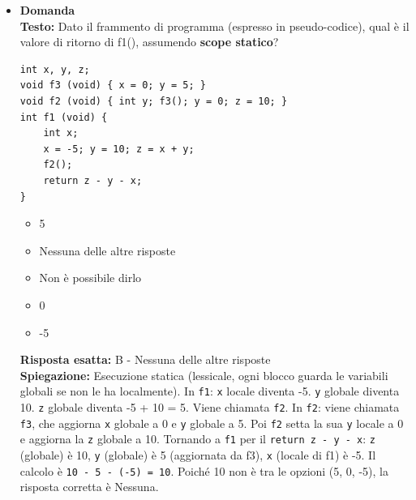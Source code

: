 \documentclass[12pt, a4paper]{article}
\newcounter{domandateoria}
\begin{document}
\begin{itemize}
    \item {}\textbf{Domanda \thedomandateoria} \\
    \textbf{Testo:} Dato il frammento di programma (espresso in pseudo-codice), qual è il valore di ritorno di f1(), assumendo \textbf{scope statico}?
\begin{verbatim}
int x, y, z;
void f3 (void) { x = 0; y = 5; }
void f2 (void) { int y; f3(); y = 0; z = 10; }
int f1 (void) { 
    int x; 
    x = -5; y = 10; z = x + y; 
    f2(); 
    return z - y - x; 
}
\end{verbatim}
    \begin{itemize}
        \item[A)] 5
        \item[B)] Nessuna delle altre risposte
        \item[C)] Non è possibile dirlo
        \item[D)] 0
        \item[E)] -5
    \end{itemize}
    \textbf{Risposta esatta:} B - Nessuna delle altre risposte \\
    \textbf{Spiegazione:} Esecuzione statica (lessicale, ogni blocco guarda le variabili globali se non le ha localmente). In \texttt{f1}: \texttt{x} locale diventa -5. \texttt{y} globale diventa 10. \texttt{z} globale diventa -5 + 10 = 5. Viene chiamata \texttt{f2}. In \texttt{f2}: viene chiamata \texttt{f3}, che aggiorna \texttt{x} globale a 0 e \texttt{y} globale a 5. Poi \texttt{f2} setta la sua \texttt{y} locale a 0 e aggiorna la \texttt{z} globale a 10. Tornando a \texttt{f1} per il \texttt{return z - y - x}: \texttt{z} (globale) è 10, \texttt{y} (globale) è 5 (aggiornata da f3), \texttt{x} (locale di f1) è -5. Il calcolo è \texttt{10 - 5 - (-5) = 10}. Poiché 10 non è tra le opzioni (5, 0, -5), la risposta corretta è Nessuna.
    \vspace{0.3cm}

\newpage


\end{itemize}
\end{document}
